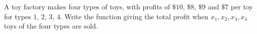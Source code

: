 A toy factory makes four types of toys, with profits of $\$10$, $\$8$, $\$9$ and $\$7$ per toy for types $1$, $2$, $3$, $4$. Write the function giving the total profit when $x_1,x_2,x_3,x_4$ toys of the four types are sold.
